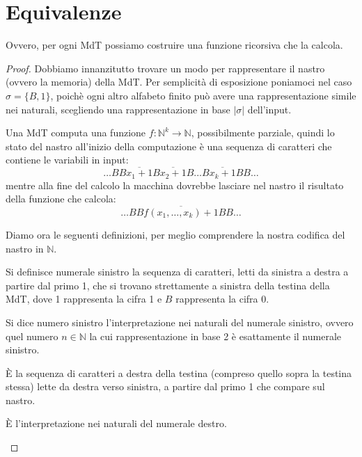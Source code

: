 \section{Equivalenze}

\begin{teorema}
Ovvero, per ogni MdT possiamo costruire una funzione ricorsiva che la calcola.
\end{teorema}

\begin{proof}
Dobbiamo innanzitutto trovare un modo per rappresentare il nastro (ovvero la
memoria) della MdT. Per semplicità di esposizione poniamoci nel caso $\sigma =
\{ B, 1 \}$, poichè ogni altro alfabeto finito può avere una rappresentazione
simile nei naturali, scegliendo una rappresentazione in base $|\sigma|$
dell'input.

Una MdT computa una funzione $f: \mathbb{N}^k \rightarrow \mathbb{N}$,
possibilmente parziale, quindi lo stato del nastro all'inizio della
computazione è una sequenza di caratteri che contiene le variabili in input:
$$\dots BB\overline{x_1+1}B\overline{x_2+1}B...B\overline{x_k+1}BB\dots $$
mentre alla fine del calcolo la macchina dovrebbe lasciare nel nastro il
risultato della funzione che calcola:
$$\dots BB\overline{f(x_1,\dots,x_k)+1}BB\dots $$

Diamo ora le seguenti definizioni, per meglio comprendere la nostra codifica
del nastro in $\mathbb{N}$.

\begin{definizione}
Si definisce numerale sinistro la sequenza di caratteri, letti da sinistra a
destra a partire dal primo 1, che si trovano strettamente a sinistra della
testina della MdT, dove 1 rappresenta la cifra 1 e $B$ rappresenta la cifra 0.
\end{definizione}
\begin{definizione}
Si dice numero sinistro l'interpretazione nei naturali del numerale sinistro,
ovvero quel numero $n \in \mathbb{N}$ la cui rappresentazione in base 2 è
esattamente il numerale sinistro.
\end{definizione}
\begin{definizione}
È la sequenza di caratteri a destra della testina (compreso quello sopra la
testina stessa) lette da destra verso sinistra, a partire dal primo 1 che
compare sul nastro.
\end{definizione}
\begin{definizione}
È l'interpretazione nei naturali del numerale destro.
\end{definizione}


\end{proof}
